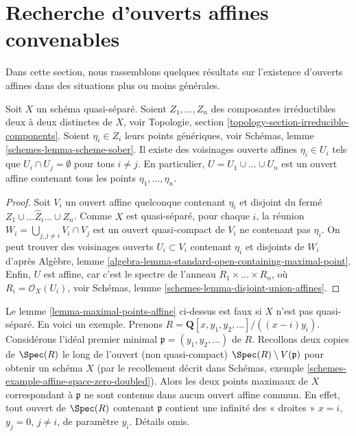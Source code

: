 \section{Recherche d'ouverts affines convenables}
\label{section-finding-affine-opens}

\noindent
Dans cette section, nous rassemblons quelques résultats sur l'existence
d'ouverts affines dans des situations plus ou moins générales.

\begin{lemma}
\label{lemma-maximal-points-affine}
Soit $X$ un schéma quasi-séparé.
Soient $Z_1, \ldots, Z_n$ des composantes irréductibles deux à deux distinctes de $X$,
voir Topologie, section \ref{topology-section-irreducible-components}.
Soient $\eta_i \in Z_i$ leurs points génériques, voir
Schémas, lemme \ref{schemes-lemma-scheme-sober}.
Il existe des voisinages ouverts affines $\eta_i \in U_i$
tels que $U_i \cap U_j = \emptyset$ pour tous $i \not = j$.
En particulier, $U = U_1 \cup \ldots \cup U_n$ est un ouvert
affine contenant tous les points $\eta_1, \ldots, \eta_n$.
\end{lemma}

\begin{proof}
Soit $V_i$ un ouvert affine quelconque contenant $\eta_i$
et disjoint du fermé $Z_1 \cup \ldots \hat Z_i \ldots \cup Z_n$.
Comme $X$ est quasi-séparé, pour chaque $i$, la réunion
$W_i = \bigcup_{j, j \not = i} V_i \cap V_j$ est un ouvert quasi-compact
de $V_i$ ne contenant pas $\eta_i$.
On peut trouver des voisinages ouverts $U_i \subset V_i$
contenant $\eta_i$ et disjoints de $W_i$ d'après
Algèbre, lemme \ref{algebra-lemma-standard-open-containing-maximal-point}.
Enfin, $U$ est affine, car c'est le spectre
de l'anneau $R_1 \times \ldots \times R_n$, où $R_i = \mathcal{O}_X(U_i)$,
voir Schémas, lemme \ref{schemes-lemma-disjoint-union-affines}.
\end{proof}

\begin{remark}
\label{remark-maximal-points-affine}
Le lemme \ref{lemma-maximal-points-affine} ci-dessus est faux si $X$
n'est pas quasi-séparé. En voici un exemple. Prenons
$R = \mathbf{Q}[x, y_1, y_2, \ldots]/((x-i)y_i)$.
Considérons l'idéal premier minimal $\mathfrak p = (y_1, y_2, \ldots)$
de $R$. Recollons deux copies de $\Spec(R)$ le long de
l'ouvert (non quasi-compact) $\Spec(R) \setminus V(\mathfrak p)$
pour obtenir un schéma $X$ (par le recollement décrit dans
Schémas, exemple \ref{schemes-example-affine-space-zero-doubled}).
Alors les deux points maximaux de $X$ correspondant à $\mathfrak p$
ne sont contenus dans aucun ouvert affine commun. En effet,
tout ouvert de $\Spec(R)$ contenant $\mathfrak p$
contient une infinité des « droites » $x = i$, $y_j = 0$,
$j \not = i$, de paramètre $y_i$. Détails omis.
\end{remark}

